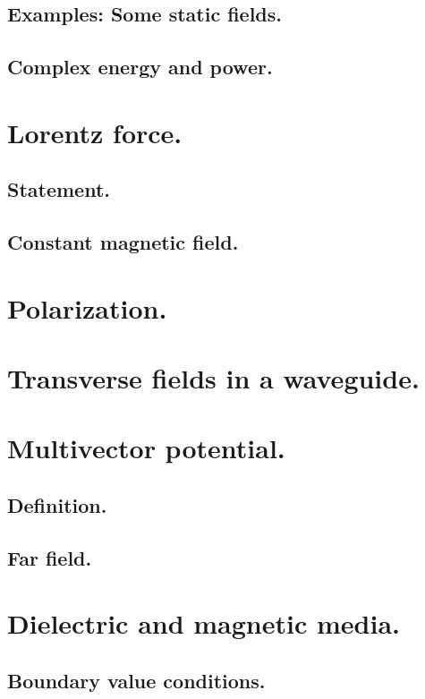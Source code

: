          \subsection{Examples: Some static fields.}
            
         \subsection{Complex energy and power.}
            
      \section{Lorentz force.}
         \subsection{Statement.}
            
         \subsection{Constant magnetic field.}
            
      \section{Polarization.}
         
      \section{Transverse fields in a waveguide.}
         
      \section{Multivector potential.}
         \subsection{Definition.}
         
         \subsection{Far field.}
            
      \section{Dielectric and magnetic media.}
         
         \subsection{Boundary value conditions.}
            
